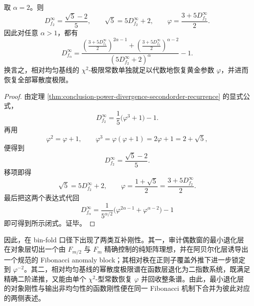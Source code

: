 \begin{corollary}\label{cor:conclusion-chi2-recovers-full-power-divergence-family}
取 \(\alpha=2\)。则
\[
\boxed{\;
D_{f_2}^\infty
=
\frac{\sqrt5-2}{5},
\qquad
\sqrt5=5D_{f_2}^\infty+2,
\qquad
\varphi=\frac{3+5D_{f_2}^\infty}{2}.\;}
\]
因此对任意 \(\alpha>1\)，都有
\[
\boxed{\;
D_{f_\alpha}^\infty
=
\frac{
\left(\frac{3+5D_{f_2}^\infty}{2}\right)^{2\alpha-1}
+
\left(\frac{3+5D_{f_2}^\infty}{2}\right)^{\alpha-2}
}{
\left(5D_{f_2}^\infty+2\right)^\alpha
}
-1.\;}
\]
换言之，相对均匀基线的 \(\chi^2\)-极限常数单独就足以代数地恢复黄金参数 \(\varphi\)，并进而恢复全部幂散度极限。
\end{corollary}
\begin{proof}
由定理 \ref{thm:conclusion-power-divergence-secondorder-recurrence} 的显式公式，
\[
D_{f_2}^\infty
=
\frac{1}{5}\bigl(\varphi^3+1\bigr)-1.
\]
再用
\[
\varphi^2=\varphi+1,
\qquad
\varphi^3=\varphi(\varphi+1)=2\varphi+1=2+\sqrt5,
\]
便得到
\[
D_{f_2}^\infty=\frac{\sqrt5-2}{5}.
\]
移项即得
\[
\sqrt5=5D_{f_2}^\infty+2,
\qquad
\varphi=\frac{1+\sqrt5}{2}=\frac{3+5D_{f_2}^\infty}{2}.
\]
最后把这两个表达式代回
\[
D_{f_\alpha}^\infty
=
\frac{1}{5^{\alpha/2}}\bigl(\varphi^{2\alpha-1}+\varphi^{\alpha-2}\bigr)-1
\]
即可得到所示闭式。证毕。
\end{proof}

\noindent
因此，在 bin-fold 口径下出现了两类互补刚性。其一，审计偶数窗的最小退化层在对象层切出一个由 \(F_{m/2}\) 与 \(F_m\) 精确控制的纯矩阵理想，并在阿贝尔化层诱导出一个规范的 Fibonacci anomaly block；其相对秩在正则子覆盖外推下进一步锁定到 \(\varphi^{-2}\)。其二，相对均匀基线的幂散度极限谱在函数层退化为二指数系统，既满足精确二阶递推，又能由单个 \(\chi^2\)-型常数恢复 \(\varphi\) 并回收整条谱。由此，最小退化层的对象刚性与输出非均匀性的函数刚性便在同一 Fibonacci 机制下合并为彼此对应的两侧表述。

\endinput
